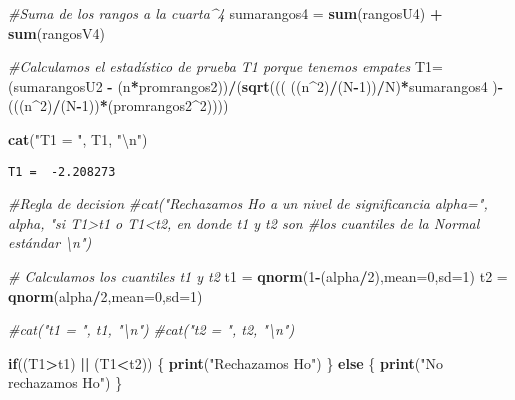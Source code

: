\documentclass[a4paper,oneside,openany]{book}
\newenvironment{Shaded}{\begin{snugshade}}{\end{snugshade}}
\newcommand{\KeywordTok}[1]{\textcolor[rgb]{0.13,0.29,0.53}{\textbf{#1}}}
\newcommand{\DataTypeTok}[1]{\textcolor[rgb]{0.13,0.29,0.53}{#1}}
\newcommand{\DecValTok}[1]{\textcolor[rgb]{0.00,0.00,0.81}{#1}}
\newcommand{\CharTok}[1]{\textcolor[rgb]{0.31,0.60,0.02}{#1}}
\newcommand{\StringTok}[1]{\textcolor[rgb]{0.31,0.60,0.02}{#1}}
\newcommand{\CommentTok}[1]{\textcolor[rgb]{0.56,0.35,0.01}{\textit{#1}}}
\newcommand{\ControlFlowTok}[1]{\textcolor[rgb]{0.13,0.29,0.53}{\textbf{#1}}}
\newcommand{\OperatorTok}[1]{\textcolor[rgb]{0.81,0.36,0.00}{\textbf{#1}}}
\newcommand{\NormalTok}[1]{#1}
\begin{document}
\begin{Shaded}
\begin{Highlighting}[]
\CommentTok{#Suma de los rangos a la cuarta^4}
\NormalTok{sumarangos4 =}\StringTok{ }\KeywordTok{sum}\NormalTok{(rangosU4) }\OperatorTok{+}\StringTok{ }\KeywordTok{sum}\NormalTok{(rangosV4)}

\CommentTok{#Calculamos el estadístico de prueba T1 porque tenemos empates}
\NormalTok{T1=(sumarangosU2 }\OperatorTok{-}\StringTok{ }\NormalTok{(n}\OperatorTok{*}\NormalTok{promrangos2))}\OperatorTok{/}\NormalTok{(}\KeywordTok{sqrt}\NormalTok{(((      ((n}\OperatorTok{^}\DecValTok{2}\NormalTok{)}\OperatorTok{/}\NormalTok{(N}\OperatorTok{-}\DecValTok{1}\NormalTok{))}\OperatorTok{/}\NormalTok{N)}\OperatorTok{*}\NormalTok{sumarangos4 )}\OperatorTok{-}\NormalTok{(((n}\OperatorTok{^}\DecValTok{2}\NormalTok{)}\OperatorTok{/}\NormalTok{(N}\OperatorTok{-}\DecValTok{1}\NormalTok{))}\OperatorTok{*}\NormalTok{(promrangos2}\OperatorTok{^}\DecValTok{2}\NormalTok{))))}

\KeywordTok{cat}\NormalTok{(}\StringTok{"T1 = "}\NormalTok{, T1, }\StringTok{"}\CharTok{\textbackslash{}n}\StringTok{"}\NormalTok{)}
\end{Highlighting}
\end{Shaded}

\begin{verbatim}
T1 =  -2.208273 
\end{verbatim}

\begin{Shaded}
\begin{Highlighting}[]
\CommentTok{#Regla de decision}
\CommentTok{#cat("Rechazamos Ho a un nivel de significancia alpha=", alpha, "si T1>t1 o T1<t2, en donde t1 y t2 son #los cuantiles de la Normal estándar \textbackslash{}n")}

\CommentTok{# Calculamos los cuantiles t1 y t2 }
\NormalTok{t1 =}\StringTok{ }\KeywordTok{qnorm}\NormalTok{(}\DecValTok{1}\OperatorTok{-}\NormalTok{(alpha}\OperatorTok{/}\DecValTok{2}\NormalTok{),}\DataTypeTok{mean=}\DecValTok{0}\NormalTok{,}\DataTypeTok{sd=}\DecValTok{1}\NormalTok{)}
\NormalTok{t2 =}\StringTok{ }\KeywordTok{qnorm}\NormalTok{(alpha}\OperatorTok{/}\DecValTok{2}\NormalTok{,}\DataTypeTok{mean=}\DecValTok{0}\NormalTok{,}\DataTypeTok{sd=}\DecValTok{1}\NormalTok{)}

\CommentTok{#cat("t1 = ", t1, "\textbackslash{}n")}
\CommentTok{#cat("t2 = ", t2, "\textbackslash{}n")}

\ControlFlowTok{if}\NormalTok{((T1}\OperatorTok{>}\NormalTok{t1) }\OperatorTok{||}\StringTok{ }\NormalTok{(T1}\OperatorTok{<}\NormalTok{t2)) \{}
  \KeywordTok{print}\NormalTok{(}\StringTok{"Rechazamos Ho"}\NormalTok{)}
\NormalTok{\} }\ControlFlowTok{else}\NormalTok{ \{}
  \KeywordTok{print}\NormalTok{(}\StringTok{"No rechazamos Ho"}\NormalTok{)}
\NormalTok{\}}
\end{Highlighting}
\end{Shaded}
\end{document}
